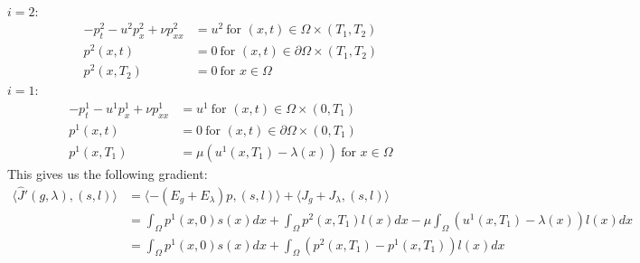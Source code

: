 \documentclass[11pt,a4paper]{report}
\begin{document}
\\
$i=2$:
\begin{align*}
-p_t^2 -u^2p_x^2 + \nu p_{xx}^2 &= u^2 \ \text{for $(x,t)\in \Omega\times(T_1,T_2)$}\\
p^2(x,t) &= 0 \ \text{for $(x,t) \in\partial\Omega\times(T_1,T_2)$ } \\
p^2(x,T_2) &= 0 \ \text{for $x \in\Omega$ }
\end{align*}
$i=1$:
\begin{align*}
-p_t^1 -u^1p_x^1 + \nu p_{xx}^1 &= u^1 \ \text{for $(x,t)\in \Omega\times(0,T_1)$}\\
p^1(x,t) &= 0 \ \text{for $(x,t) \in\partial\Omega\times(0,T_1)$ } \\
p^1(x,T_1) &= \mu(u^1(x,T_1)-\lambda(x)) \ \text{for $x \in\Omega$ }
\end{align*}
This gives us the following gradient:
\begin{align*}
\langle \hat{J}'(g,\lambda), (s,l)\rangle &=\langle -(E_g+E_{\lambda})p , (s,l)\rangle + \langle J_g+J_{\lambda}, (s,l)\rangle \\
&= \int_{\Omega} p^1(x,0)s(x)dx + \int_{\Omega} p^2(x,T_1)l(x)dx -\mu\int_{\Omega} (u^1(x,T_1)-\lambda(x))l(x)dx \\
&= \int_{\Omega} p^1(x,0)s(x)dx + \int_{\Omega} (p^2(x,T_1)-p^1(x,T_1))l(x)dx
\end{align*}
\end{document}
